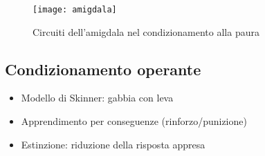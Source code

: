 \documentclass[11pt]{article}
\begin{document}
\begin{figure}[h]
    \centering
    \texttt{[image: amigdala]} %
    \caption{Circuiti dell'amigdala nel condizionamento alla paura}
    \label{fig:amigdala}
\end{figure}

\subsection*{Condizionamento operante}
\begin{itemize}
    \item Modello di Skinner: gabbia con leva
    \item Apprendimento per conseguenze (rinforzo/punizione)
    \item Estinzione: riduzione della risposta appresa
\end{itemize}
\end{document}
